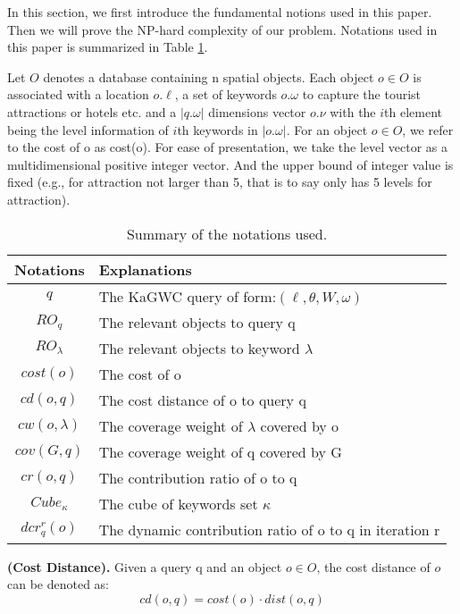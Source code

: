 In this section, we first introduce the fundamental notions used in this paper. Then we will prove the NP-hard complexity of our problem. Notations used in this paper is summarized in Table \ref{T3}.

Let $O$ denotes a database containing n spatial objects. Each object $o\in O$ is associated with a location $o.\ell$, a set of keywords $o.\omega$ to capture the tourist attractions or hotels etc. and a $|q.\omega|$ dimensions vector $o.\nu$ with the $i$th element being the level information of $i$th keywords in $|o.\omega|$. For an object $o\in O$, we  refer to the cost of o as cost(o). For ease of presentation, we take the level vector as a multidimensional positive integer vector. And the upper bound of integer value is fixed (e.g., for attraction not larger than 5, that is to say only has 5 levels for attraction).

\begin{table}
\centering
\begin{tabular}{|c|l|}
\hline
Notations & Explanations \\
\hline
$q$ & The KaGWC query of form:$(\ell,\theta,W,\omega)$\\
\hline
$RO_q$ & The relevant objects to query q\\
\hline
$RO_\lambda$ & The relevant objects to keyword $\lambda$\\
\hline
$cost(o)$ & The cost of o \\
\hline
$cd(o,q)$ & The cost distance of o to query q\\
\hline
$cw(o,\lambda)$ & The coverage weight of $\lambda$ covered by o\\
\hline
$cov(G,q)$ & The coverage weight of q covered by G \\
\hline
$cr(o,q)$ & The contribution ratio of o to q\\
\hline
$Cube_\kappa$ & The cube of keywords set $\kappa$\\
\hline
$dcr_q^r(o)$ & The dynamic contribution ratio of o to q in iteration r\\
\hline
\end{tabular}
\caption{Summary of the notations used.} \label{T3}
\end{table}

\noindent
\begin{definition}
    \textbf{(Cost Distance).} Given a query q and an object $o\in O$, the cost distance of $o$ can be denoted as:
    \begin{equation}
        cd(o,q)=cost(o) \cdot dist(o,q)
    \end{equation}
\end{definition}

